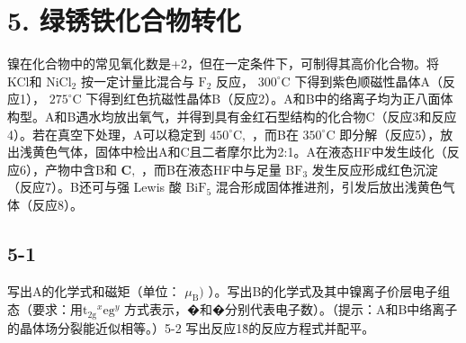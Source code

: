 \section*{5. 绿锈铁化合物转化}
镍在化合物中的常⻅氧化数是+2，但在⼀定条件下，可制得其⾼价化合物。将KCl和 $\mathrm { N i C l _ { 2 } }$ 按⼀定计量⽐混合与 $\mathrm { F } _ { 2 }$ 反应， $3 0 0 ^ { \circ } \mathrm { C }$ 下得到紫⾊顺磁性晶体A（反应1）， $2 7 5 ^ { \circ } \mathrm { C }$ 下得到红⾊抗磁性晶体B（反应2）。A和B中的络离⼦均为正⼋⾯体构型。A和B遇⽔均放出氧⽓，并得到具有⾦红⽯型结构的化合物C（反应3和反应4）。若在真空下处理，A可以稳定到 $4 5 0 ^ { \circ } \mathrm { C } ,$ ，⽽B在 $3 5 0 ^ { \circ } \mathrm { C }$ 即分解（反应5），放出浅⻩⾊⽓体，固体中检出A和C且⼆者摩尔⽐为2:1。A在液态HF中发⽣歧化（反应6），产物中含B和 $\mathbf { C } ,$ ，⽽B在液态HF中与⾜量 $\mathrm { B F _ { 3 } }$ 发⽣反应形成红⾊沉淀（反应7）。B还可与强 Lewis 酸 $\mathrm { B i F } _ { 5 }$ 混合形成固体推进剂，引发后放出浅⻩⾊⽓体（反应8）。

\subsection*{5-1}
写出A的化学式和磁矩（单位： $\mu _ { \mathrm { B } } )$ ）。写出B的化学式及其中镍离⼦价层电⼦组态（要求：⽤$\mathrm { t _ { 2 g } } ^ { x } \mathrm { e g } ^ { y }$ ⽅式表⽰，�和�分别代表电⼦数）。（提⽰：A和B中络离⼦的晶体场分裂能近似相等。）5-2 写出反应1\~8的反应⽅程式并配平。
